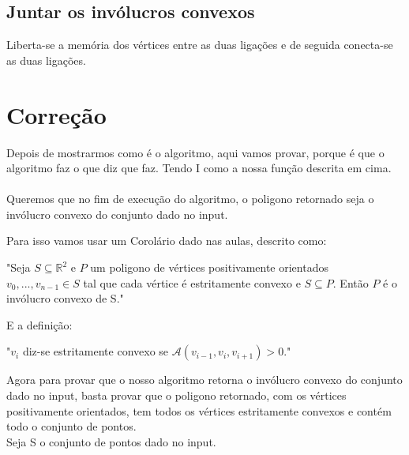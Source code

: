 \documentclass[11pt]{article}
\begin{document}
\subsection{ Juntar os invólucros convexos } 
Liberta-se a memória dos vértices entre as duas ligações e de seguida 
conecta-se as duas ligações.


\section{Correção}
Depois de mostrarmos como é o algoritmo,
aqui vamos provar, porque é que o algoritmo faz o que diz que faz.
Tendo I como a nossa função descrita em cima.\\
\\
Queremos que no fim de execução do algoritmo, o poligono
retornado seja o invólucro convexo do conjunto dado 
no input.\par
Para isso vamos usar um Corolário dado nas aulas, descrito como:

\begin{center}
    "Seja $S \subseteq \mathbb{R}^2$ e $P$ um poligono de vértices 
    positivamente orientados $v_0,...,v_{n-1} \in S$ tal que cada
    vértice é estritamente convexo e $S \subseteq P$. Então $P$ é
    o invólucro convexo de S."
\end{center}

E a definição:

\begin{center}
    "$v_i$ diz-se estritamente convexo se $\mathcal{A}(v_{i-1},v_i,v_{i+1}) > 0$."
\end{center}

Agora para provar que o nosso algoritmo retorna o invólucro convexo
do conjunto dado no input, basta provar que o poligono retornado,
com os vértices positivamente orientados, tem todos os vértices 
estritamente convexos e contém todo o conjunto de pontos.\\

Seja S o conjunto de pontos dado no input.\\
\end{document}

